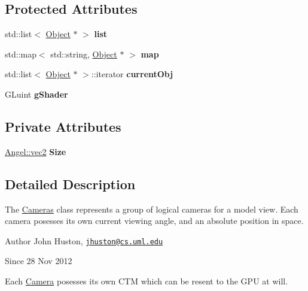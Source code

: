 \subsection*{Protected Attributes}
\begin{DoxyCompactItemize}
\item 
\hypertarget{class_scene_ac04ab16dd305db619afe5f8ec6a02ebc}{std\-::list$<$ \hyperlink{class_object}{Object} $\ast$ $>$ {\bfseries list}}\label{class_scene_ac04ab16dd305db619afe5f8ec6a02ebc}

\item 
\hypertarget{class_scene_ad4f10706155e3e956fe36a4b5f0ef731}{std\-::map$<$ std\-::string, \hyperlink{class_object}{Object} $\ast$ $>$ {\bfseries map}}\label{class_scene_ad4f10706155e3e956fe36a4b5f0ef731}

\item 
\hypertarget{class_scene_acbf527a005c67461e03d343a9f853807}{std\-::list$<$ \hyperlink{class_object}{Object} $\ast$ $>$\-::iterator {\bfseries current\-Obj}}\label{class_scene_acbf527a005c67461e03d343a9f853807}

\item 
\hypertarget{class_scene_aece20244e3987065f05057452a14d81f}{G\-Luint {\bfseries g\-Shader}}\label{class_scene_aece20244e3987065f05057452a14d81f}

\end{DoxyCompactItemize}
\subsection*{Private Attributes}
\begin{DoxyCompactItemize}
\item 
\hypertarget{class_cameras_afd25ca41e4caac50d457ee200b6b9c23}{\hyperlink{struct_angel_1_1vec2}{Angel\-::vec2} {\bfseries Size}}\label{class_cameras_afd25ca41e4caac50d457ee200b6b9c23}

\end{DoxyCompactItemize}


\subsection{Detailed Description}
The \hyperlink{class_cameras}{Cameras} class represents a group of logical cameras for a model view. Each camera posesses its own current viewing angle, and an absolute position in space. 

\begin{DoxyAuthor}{Author}
John Huston, \href{mailto:jhuston@cs.uml.edu}{\tt jhuston@cs.\-uml.\-edu} 
\end{DoxyAuthor}
\begin{DoxySince}{Since}
28 Nov 2012
\end{DoxySince}
Each \hyperlink{class_camera}{Camera} posesses its own C\-T\-M which can be resent to the G\-P\-U at will. 

